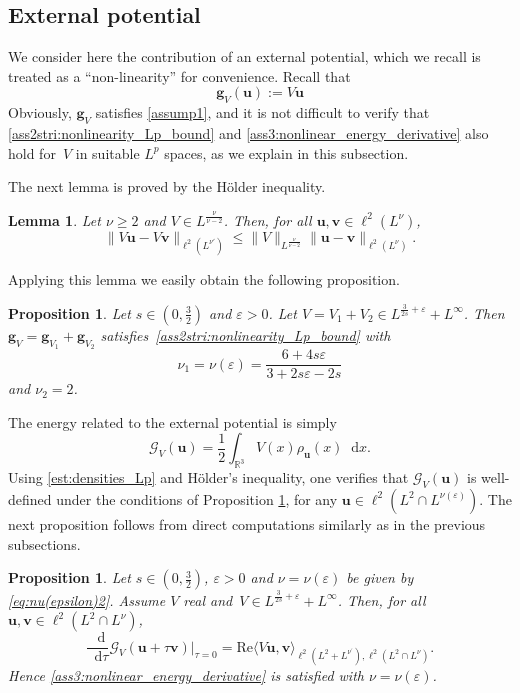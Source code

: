 \documentclass[12pt,a4paper]{amsart}
\newtheorem{lemma}[theorem]{Lemma}
\newtheorem{prop}[theorem]{Proposition}
\numberwithin{equation}{section}
\newcommand{\ulu}{\boldsymbol{u}}
\newcommand{\ulv}{\boldsymbol{v}}
\newcommand{\ulg}{\boldsymbol{g}}
\newcommand*\diff{\mathop{}\!\mathrm{d}}
\begin{document}
	\subsection{External potential}\label{subsec:ext}
	
	We consider here the contribution of an external potential, which we recall is treated as a ``non-linearity'' for convenience. Recall that
	\begin{equation*}
		\ulg_V (\ulu) := V\ulu
	\end{equation*}
	Obviously, $\ulg_V$ satisfies \ref{assump1}, and it is not difficult to verify that \ref{ass2stri:nonlinearity_Lp_bound} and \ref{ass3:nonlinear_energy_derivative} also hold for~$V$ in suitable $L^p$ spaces, as we explain in this subsection.
	
	The next lemma is proved by the H{\"o}lder inequality.
	\begin{lemma}
		Let $\nu\ge2$ and $V \in L^{\frac{\nu}{\nu-2}}$. Then, for all $\ulu,\ulv\in\ell^2(L^\nu)$, 
		\begin{equation}\label{est:ext_pot_Lp}
			\| V \ulu - V \ulv \|_{\ell^2(L^{\nu'})} \leq \| V \|_{L^{\frac{\nu}{\nu-2}}} \| \ulu - \ulv \|_{\ell^2(L^\nu)} . 
		\end{equation}
	\end{lemma}
	Applying this lemma we easily obtain the following proposition.
	\begin{prop}\label{prop:external}
		Let $s\in(0,\frac32)$ and $\varepsilon>0$. Let $V=V_1+V_2\in L^{\frac{3}{2s}+\varepsilon}+L^\infty$. Then~$\ulg_V=\ulg_{V_1}+\ulg_{V_2}$ satisfies~\ref{ass2stri:nonlinearity_Lp_bound} with
		\begin{equation}\label{eq:nu(epsilon)2}
			\nu_1=\nu(\varepsilon)=\frac{6+4s\varepsilon}{3+2s\varepsilon -2s}
		\end{equation}
		and $\nu_2=2$.
	\end{prop}
	The energy related to the external potential is simply
	\begin{equation}
		\mathscr{G}_V(\ulu) = \frac{1}{2} \int_{\mathbb{R}^3} V(x) \rho_{\ulu}(x) \diff x. 
	\end{equation}
	Using \eqref{est:densities_Lp} and Hölder's inequality, one verifies that $\mathscr{G}_V(\ulu)$ is well-defined under the conditions of Proposition \ref{prop:external}, for any $\ulu\in\ell^2(L^2\cap L^{\nu(\varepsilon)})$. The next proposition follows from direct computations similarly as in the previous subsections. 
	\begin{prop}
		Let $s\in(0,\frac32)$, $\varepsilon>0$ and $\nu=\nu(\varepsilon)$ be given by \eqref{eq:nu(epsilon)2}. Assume $V$ real and~$V\in L^{\frac{3}{2s}+\varepsilon}+L^\infty$. Then, for all $\ulu,\ulv\in\ell^2(L^2\cap L^\nu)$,
		\begin{equation}
			\frac{\diff}{\diff \tau} \mathscr{G}_V(\ulu + \tau \ulv) |_{\tau=0} = \mathrm{Re} \langle V \ulu, \ulv \rangle_{\ell^2(L^2+L^{\nu^\prime}),\ell^2(L^2\cap L^\nu)} .
		\end{equation}
		Hence \ref{ass3:nonlinear_energy_derivative} is satisfied with $\nu=\nu(\varepsilon)$.
	\end{prop}
	
\end{document}
